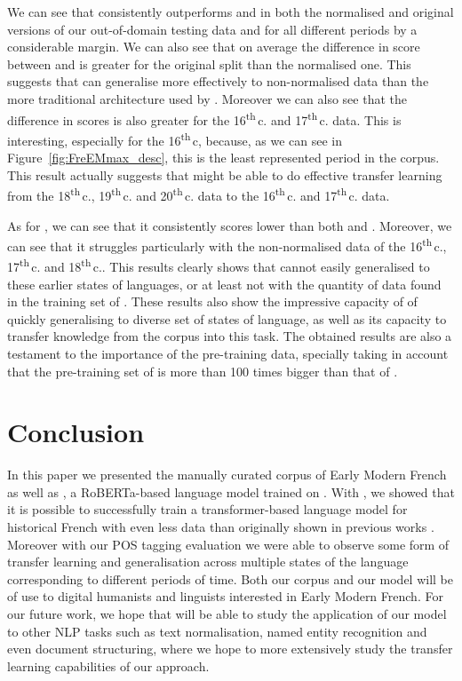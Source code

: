 We can see that \dalembert consistently outperforms \pieextended and \camembert in both the normalised and original versions of our out-of-domain testing data and for all different periods by a considerable margin. We can also see that on average the difference in score between \dalembert and \pieextended is greater for the original split than the normalised one. This suggests that \dalembert can generalise more effectively to non-normalised data than the more traditional architecture used by \pieextended. Moreover we can also see that the difference in scores is also greater for the 16\textsuperscript{th}\,c. and 17\textsuperscript{th}\,c. data. This is interesting, especially for the 16\textsuperscript{th}\,c, because, as we can see in Figure~\ref{fig:FreEMmax_desc}, this is the least represented period in the \freemmax corpus. This result actually suggests that \dalembert might be able to do effective transfer learning from the 18\textsuperscript{th}\,c., 19\textsuperscript{th}\,c. and 20\textsuperscript{th}\,c. data to the 16\textsuperscript{th}\,c. and 17\textsuperscript{th}\,c. data.

As for \camembert, we can see that it consistently scores lower than both \dalembert and \pieextended. Moreover, we can see that it struggles particularly with the non-normalised data of the 16\textsuperscript{th}\,c., 17\textsuperscript{th}\,c. and 18\textsuperscript{th}\,c.. This results clearly shows that \camembert cannot easily generalised to these earlier states of languages, or at least not with the quantity of data found in the training set of \freemlpm. These results also show the impressive capacity of \dalembert of quickly generalising to diverse set of states of language, as well as its capacity to transfer knowledge from the \freemmax corpus into this task. The obtained results are also a testament to the importance of the pre-training data, specially taking in account that the pre-training set of \camembert is more than 100 times bigger than that of \dalembert.

\section{Conclusion}

In this paper we presented the manually curated \freemmax corpus of Early Modern French as well as \dalembert, a RoBERTa-based language model trained on \freemmax. With \dalembert, we showed that it is possible to successfully train a transformer-based language model for historical French with even less data than originally shown in previous works \cite{martin-etal-2020-camembert}. Moreover with our POS tagging evaluation we were able to observe some form of transfer learning and generalisation across multiple states of the language corresponding to different periods of time. Both our corpus and our model will be of use to digital humanists and linguists interested in Early Modern French. For our future work, we hope that will be able to study the application of our \dalembert model to other NLP tasks such as text normalisation, named entity recognition and even document structuring, where we hope to more extensively study the transfer learning capabilities of our approach.
